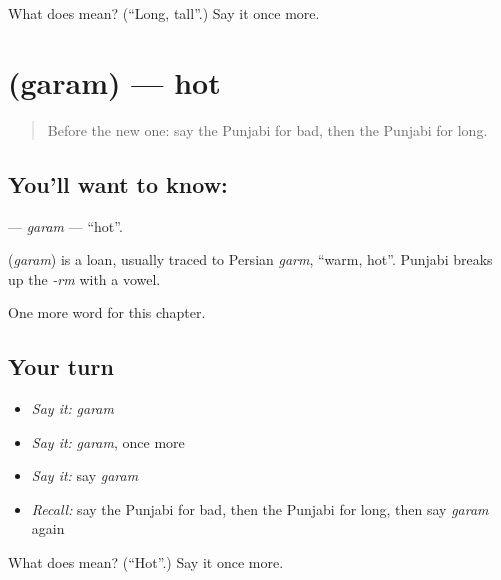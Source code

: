\begin{tcolorbox}[breakable,colback=teal!4,colframe=teal!35!black,title={Before you move on}]
What does  mean? (\textquotedblleft{}Long, tall\textquotedblright{}.) Say it once more.
\end{tcolorbox}
\section[\texorpdfstring{\pa{ਗਰਮ} (garam)}{ਗਰਮ (garam)}]{ (garam) — hot}

\label{lesson:PA-C80-garam}



\begin{quote}
Before the new one: say the Punjabi for bad, then the Punjabi for long.
\end{quote}

\subsection*{You'll want to know: }
\textbf{} — \emph{garam} — \textquotedblleft{}hot\textquotedblright{}.

\begin{cousinweb}
\textbf{} (\emph{garam}) is a loan, usually traced to Persian \emph{garm}, \textquotedblleft{}warm, hot\textquotedblright{}. Punjabi breaks up the \emph{-rm} with a vowel.
\end{cousinweb}

\begin{grammarlens}[title={What you've built}]
One more word for this chapter.
\end{grammarlens}

\subsection*{Your turn}
\begin{itemize}
\raggedright
  \item \emph{Say it:} \emph{garam}
  \item \emph{Say it:} \emph{garam}, once more
  \item \emph{Say it:} say \emph{garam}
  \item \emph{Recall:} say the Punjabi for bad, then the Punjabi for long, then say \emph{garam} again
\end{itemize}

\begin{tcolorbox}[breakable,colback=teal!4,colframe=teal!35!black,title={Before you move on}]
What does  mean? (\textquotedblleft{}Hot\textquotedblright{}.) Say it once more.
\end{tcolorbox}

